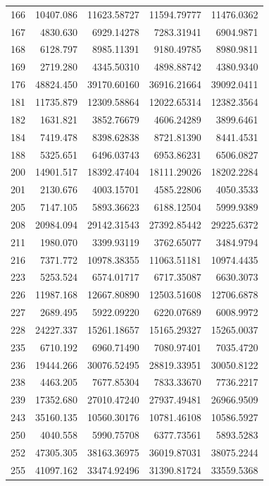 \documentclass[
  12pt,
]{article}
\begin{document}
\begin{longtable}[]{@{}lrrrr@{}}
166 & 10407.086 & 11623.58727 & 11594.79777 & 11476.0362 \\
167 & 4830.630 & 6929.14278 & 7283.31941 & 6904.9871 \\
168 & 6128.797 & 8985.11391 & 9180.49785 & 8980.9811 \\
169 & 2719.280 & 4345.50310 & 4898.88742 & 4380.9340 \\
176 & 48824.450 & 39170.60160 & 36916.21664 & 39092.0411 \\
181 & 11735.879 & 12309.58864 & 12022.65314 & 12382.3564 \\
182 & 1631.821 & 3852.76679 & 4606.24289 & 3899.6461 \\
184 & 7419.478 & 8398.62838 & 8721.81390 & 8441.4531 \\
188 & 5325.651 & 6496.03743 & 6953.86231 & 6506.0827 \\
200 & 14901.517 & 18392.47404 & 18111.29026 & 18202.2284 \\
201 & 2130.676 & 4003.15701 & 4585.22806 & 4050.3533 \\
205 & 7147.105 & 5893.36623 & 6188.12504 & 5999.9389 \\
208 & 20984.094 & 29142.31543 & 27392.85442 & 29225.6372 \\
211 & 1980.070 & 3399.93119 & 3762.65077 & 3484.9794 \\
216 & 7371.772 & 10978.38355 & 11063.51181 & 10974.4435 \\
223 & 5253.524 & 6574.01717 & 6717.35087 & 6630.3073 \\
226 & 11987.168 & 12667.80890 & 12503.51608 & 12706.6878 \\
227 & 2689.495 & 5922.09220 & 6220.07689 & 6008.9972 \\
228 & 24227.337 & 15261.18657 & 15165.29327 & 15265.0037 \\
235 & 6710.192 & 6960.71490 & 7080.97401 & 7035.4720 \\
236 & 19444.266 & 30076.52495 & 28819.33951 & 30050.8122 \\
238 & 4463.205 & 7677.85304 & 7833.33670 & 7736.2217 \\
239 & 17352.680 & 27010.47240 & 27937.49481 & 26966.9509 \\
243 & 35160.135 & 10560.30176 & 10781.46108 & 10586.5927 \\
250 & 4040.558 & 5990.75708 & 6377.73561 & 5893.5283 \\
252 & 47305.305 & 38163.36975 & 36019.87031 & 38075.2244 \\
255 & 41097.162 & 33474.92496 & 31390.81724 & 33559.5368 \\

\end{longtable}
\end{document}
